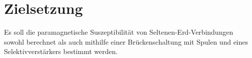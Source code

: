 
\section{Zielsetzung}
\label{sec:Zielsetzung}
Es soll die paramagnetische Suszeptibilität von Seltenen-Erd-Verbindungen sowohl berechnet als auch mithilfe einer Brückenschaltung mit Spulen und eines Selektivverstärkers bestimmt werden.